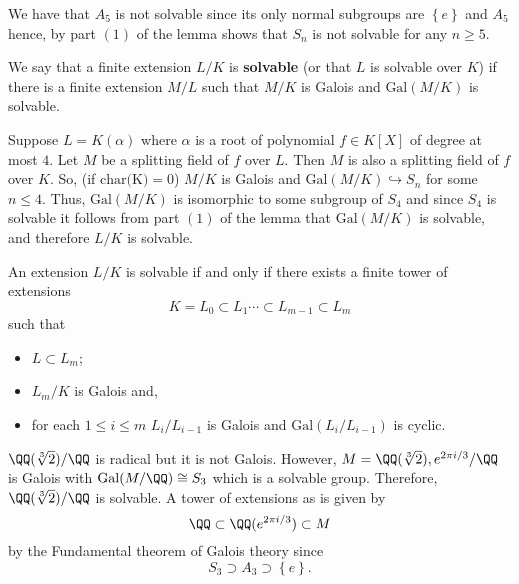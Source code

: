 \documentclass[12pt, a4paper]{article}
\newcommand{\gal}{\text{Gal}}
\begin{document}
\begin{example}
    We have that \(A_5\) is not solvable since its only normal subgroups are \(\left\{ e \right\}\) and \(A_5\) hence, by part \((1)\) of the lemma shows that \(S_n\) is not solvable for any \(n\geq 5\).
\end{example}

\begin{definition}
    We say that a finite extension \(L/K\) is \textbf{solvable} (or that \(L\) is solvable over \(K\)) if there is a finite extension \(M/L\) such that \(M/K\) is Galois and \(\gal(M/K)\) is solvable.
\end{definition}

\begin{mdexample}
    Suppose \(L = K(\alpha)\) where \(\alpha\) is a root of polynomial \(f\in K[X]\) of degree at most \(4\). Let \(M\) be a splitting field of \(f\) over \(L\). Then \(M\) is also a splitting field of \(f\) over \(K\). So, (if \(\text{char(K)}=0\)) \(M/K\) is Galois and \(\gal(M/K) \hookrightarrow S_n\) for some \(n \leq 4\). Thus, \(\gal(M/K)\) is isomorphic to some subgroup of \(S_4\) and since \(S_4\) is solvable it follows from part \((1)\) of the lemma that \(\gal(M/K)\) is solvable, and therefore \(L/K\) is solvable.
\end{mdexample}

\begin{mdlemma}
    An extension \(L/K\) is solvable if and only if there exists a finite tower of extensions 
    \[K = L_0 \subset L_1 \cdots \subset L_{m-1}\subset L_m\]
    such that 
    \begin{itemize}
        \item \(L\subset L_m\);
        \item \(L_m/K\) is Galois and,
        \item for each \(1\leq i \leq m\) \(L_i/L_{i-1}\) is Galois and \(\gal(L_i/L_{i-1})\) is cyclic.
    \end{itemize}
\end{mdlemma}

\begin{mdexample}
    \(\QQ(\sqrt[3]{2})/\QQ\) is radical but it is not Galois. However, \(M=\QQ(\sqrt[3]{2}),e^{2\pi i/3} /\QQ\)  is Galois with \(\gal(M/\QQ)\cong S_3\) which is a solvable group. Therefore, \(\QQ(\sqrt[3]{2})/\QQ\) is solvable. A tower of extensions as is given by 
    \[\QQ\subset \QQ(e^{2\pi i/3}) \subset M\]
    by the Fundamental theorem of Galois theory since 
    \[S_3\supset A_3 \supset \left\{ e \right\}.\]
\end{mdexample}
\end{document}
